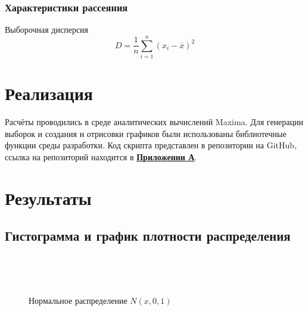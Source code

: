 \documentclass[12pt]{article}
\begin{document}
\subsubsection{Характеристики рассеяния}
Выборочная дисперсия
\begin{equation}
	D = \frac{1}{n} \sum_{i = 1}^{n} (x_i - \overline{x})^2
\end{equation}

\newpage

\section{Реализация}
Расчёты проводились в среде аналитических вычислений Maxima. Для генерации выборок и создания и отрисовки графиков были использованы библиотечные функции среды разработки. Код скрипта представлен в репозитории на GitHub, ссылка на репозиторий находится в \hyperlink{addition}{\textbf{Приложении А}}.

\newpage
\section{Результаты}
\subsection{Гистограмма и график плотности распределения}
\begin{figure}[h!]
	\begin{center}
	\begin{minipage}[h]{0.55\linewidth}
	\end{minipage}
	\phantom{0}\\
	\begin{minipage}[h]{0.55\linewidth}
	\end{minipage}
	\phantom{0}\\
	\begin{minipage}[h]{0.55\linewidth}
	\end{minipage}
	\caption{Нормальное распределение $N(x, 0, 1)$}
\end{center}
\end{figure}
\newpage
\end{document}
